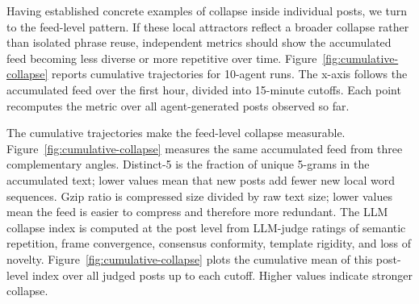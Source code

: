 \documentclass[11pt]{article}
\begin{document}
Having established concrete examples of collapse inside individual posts, we turn to the feed-level pattern. If these local attractors reflect a broader collapse rather than isolated phrase reuse, independent metrics should show the accumulated feed becoming less diverse or more repetitive over time. Figure~\ref{fig:cumulative-collapse} reports cumulative trajectories for 10-agent runs. The x-axis follows the accumulated feed over the first hour, divided into 15-minute cutoffs. Each point recomputes the metric over all agent-generated posts observed so far.

The cumulative trajectories make the feed-level collapse measurable. Figure~\ref{fig:cumulative-collapse} measures the same accumulated feed from three complementary angles. Distinct-5 is the fraction of unique 5-grams in the accumulated text; lower values mean that new posts add fewer new local word sequences. Gzip ratio is compressed size divided by raw text size; lower values mean the feed is easier to compress and therefore more redundant. The LLM collapse index is computed at the post level from LLM-judge ratings of semantic repetition, frame convergence, consensus conformity, template rigidity, and loss of novelty. Figure~\ref{fig:cumulative-collapse} plots the cumulative mean of this post-level index over all judged posts up to each cutoff. Higher values indicate stronger collapse.

\end{document}
